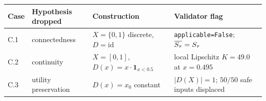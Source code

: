 \small
\setlength{\tabcolsep}{5pt}
\begin{tabular}{@{}llll@{}}
\toprule
Case & Hypothesis dropped   & Construction                                & Validator flag \\
\midrule
C.1  & connectedness        & $X=\{0,1\}$ discrete, $D=\mathrm{id}$       & \texttt{applicable=False}; $\overline{S_\tau}=S_\tau$ \\
C.2  & continuity           & $X=[0,1]$, $D(x)=x\cdot\mathbf{1}_{x<0.5}$  & local Lipschitz $K=49.0$ at $x{=}0.495$ \\
C.3  & utility preservation & $D(x)=x_0$ constant                         & $|D(X)|=1$; $50/50$ safe inputs displaced \\
\bottomrule
\end{tabular}
